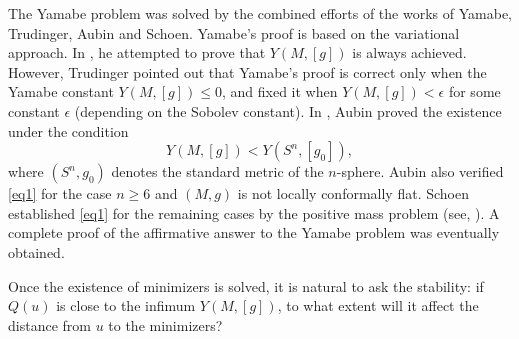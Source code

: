 \documentclass[12pt]{amsart}
\begin{document}
   The Yamabe problem was solved by the combined efforts of the works of Yamabe\cite{Ya60},
   Trudinger\cite{Tr68}, Aubin\cite{Au76a} and Schoen\cite{Sc84}. Yamabe's proof is based on the variational approach. In \cite{Ya60}, he attempted to prove that $Y(M,[g])$ is always achieved. However, Trudinger\cite{Tr68} pointed out that Yamabe's proof is correct only when the Yamabe constant $Y(M,[g]) \leq 0$, and fixed it when $Y(M,[g]) < \epsilon$ for some constant $\epsilon$ (depending on the Sobolev constant). In \cite{Au76a}, Aubin proved the existence under the condition 
   \begin{equation}\label{eq1}
       Y(M,[g]) < Y(S^n,[g_0]),
   \end{equation}
   where $(S^n,g_0)$ denotes the standard metric of the $n$-sphere. Aubin also verified \eqref{eq1} for the case $n \ge 6$ and $(M,g)$ is not locally conformally flat. Schoen\cite{Sc84} established \eqref{eq1} for the remaining cases by the positive mass problem (see\cite{SY79}, \cite{SY88}). A complete proof of the affirmative answer to the Yamabe problem was eventually obtained.

   Once the existence of minimizers is solved, it is natural to ask the stability: if $Q(u)$ is close to the infimum $Y(M,[g])$, to what extent will it affect the distance from $u$ to the minimizers?
\end{document}
